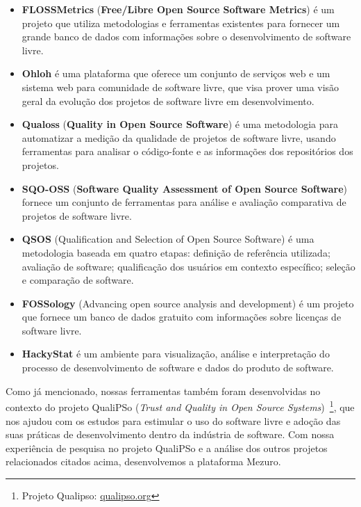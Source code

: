 \begin{itemize}

\item \textbf{FLOSSMetrics} (\textbf{Free/Libre Open Source Software Metrics})
é um projeto que utiliza metodologias e ferramentas existentes para fornecer um
grande banco de dados com informações sobre o desenvolvimento de software livre.

\item \textbf{Ohloh} é uma plataforma que oferece um conjunto de serviços web
e um sistema web para comunidade de software livre, que visa prover uma
visão geral da evolução dos projetos de software livre em desenvolvimento.

\item \textbf{Qualoss} (\textbf{Quality in Open Source Software}) é uma
metodologia para automatizar a medição da qualidade de projetos de software
livre, usando ferramentas para analisar o código-fonte e as informações dos 
repositórios dos projetos.

\item \textbf{SQO-OSS} (\textbf{Software Quality Assessment of Open Source
Software}) fornece um conjunto de ferramentas para análise e avaliação
comparativa de projetos de software livre.

\item \textbf{QSOS} (Qualification and Selection of Open Source Software)
é uma metodologia baseada em quatro etapas: definição de referência utilizada;
avaliação de software; qualificação dos usuários em contexto específico;
seleção e comparação de software.

\item \textbf{FOSSology} (Advancing open source analysis and development)
é um projeto que fornece um banco de dados gratuito com informações sobre
licenças de software livre.

\item \textbf{HackyStat} é um ambiente para visualização, análise e
interpretação do processo de desenvolvimento de software e dados do produto
de software.

\end{itemize}

Como já mencionado, nossas ferramentas também foram desenvolvidas no contexto do
projeto QualiPSo (\textit{Trust and Quality in Open Source
Systems})~\footnote{Projeto Qualipso: \url{qualipso.org}},
que nos ajudou com os estudos para estimular o uso do software livre
e adoção das suas práticas de desenvolvimento dentro da indústria de software.
%
Com nossa experiência de pesquisa no projeto QualiPSo e a análise dos
outros projetos relacionados citados acima, desenvolvemos a plataforma Mezuro.

